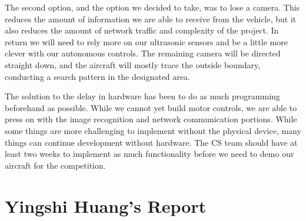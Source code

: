 \documentclass[onecolumn, draftclsnofoot,10pt, compsoc]{IEEEtran}
\begin{document}
The second option, and the option we decided to take, was to lose a camera. This reduces the amount of information we are able to receive from the vehicle, but it also reduces the amount of network traffic and complexity of the project. In return we will need to rely more on our ultrasonic sensors and be a little more clever with our autonomous controls. The remaining camera will be directed straight down, and the aircraft will mostly trace the outside boundary, conducting a search pattern in the designated area.

The solution to the delay in hardware has been to do as much programming beforehand as possible. While we cannot yet build motor controls, we are able to press on with the image recognition and network communication portions. While some things are more challenging to implement without the physical device, many things can continue development without hardware. The CS team should have at least two weeks to implement as much functionality before we need to demo our aircraft for the competition.



\section{Yingshi Huang's Report}
\end{document}
